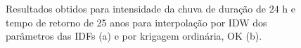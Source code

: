 \documentclass[
]{agujournal2019}
\begin{document}
\begin{figure}
\begin{minipage}{\linewidth}
{}


\end{minipage}%

\caption{\label{fig-Figura33}Resultados obtidos para intensidade da
chuva de duração de 24 h e tempo de retorno de 25 anos para interpolação
por IDW dos parâmetros das IDFs (a) e por krigagem ordinária, OK (b).}

\end{figure}%

\begin{figure}

\begin{minipage}{\linewidth}



\end{minipage}%
\newline
\begin{minipage}{\linewidth}

\centering{

}
\end{minipage}
\end{figure}
\end{document}
